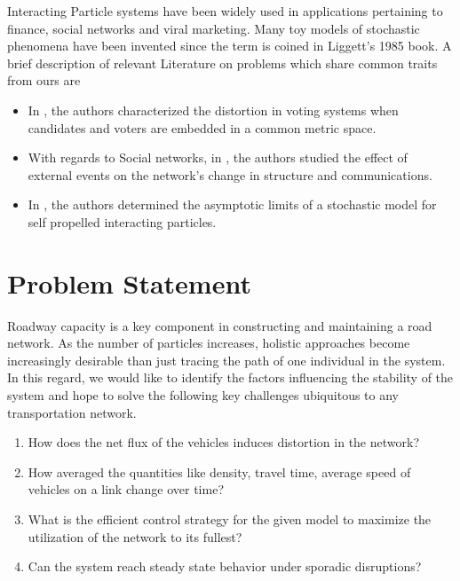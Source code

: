 \documentclass[a4paper,12pt]{scrartcl}
\begin{document}
Interacting Particle systems have been widely used in applications pertaining to finance, social networks and viral marketing.
Many toy models of stochastic phenomena have been invented since the term is coined in Liggett's 1985 book.
\newline
A brief description of relevant Literature on problems which share common traits from ours are 
\begin{itemize}
\item In \cite{ChengCoRR2017}, the authors characterized the distortion in voting systems when candidates and voters are embedded in a common metric space. 

\item With regards to Social networks, in \cite{romeroIWWWC2016}, the authors studied the effect of external events on the network's change in structure and communications.

\item In \cite{carrilloWS2010}, the authors determined the asymptotic limits of a stochastic model for self propelled interacting particles.
\end{itemize}

\section*{Problem Statement}
Roadway capacity is a key component in constructing and maintaining a road network.
As the number of particles increases, holistic approaches become increasingly desirable than just tracing the path of one individual in the system. 
In this regard, we would like to identify the factors influencing the stability of the system and hope to solve the following key challenges ubiquitous to any transportation network.

\begin{enumerate}
\item How does the net flux of the vehicles induces distortion in the network?

\item How averaged the quantities like density, travel time, average speed of vehicles on a link change over time?

\item What is the efficient control strategy for the given model to maximize the utilization of the network to its fullest?

\item Can the system reach steady state behavior under sporadic disruptions?
\end{enumerate} 
\end{document}
